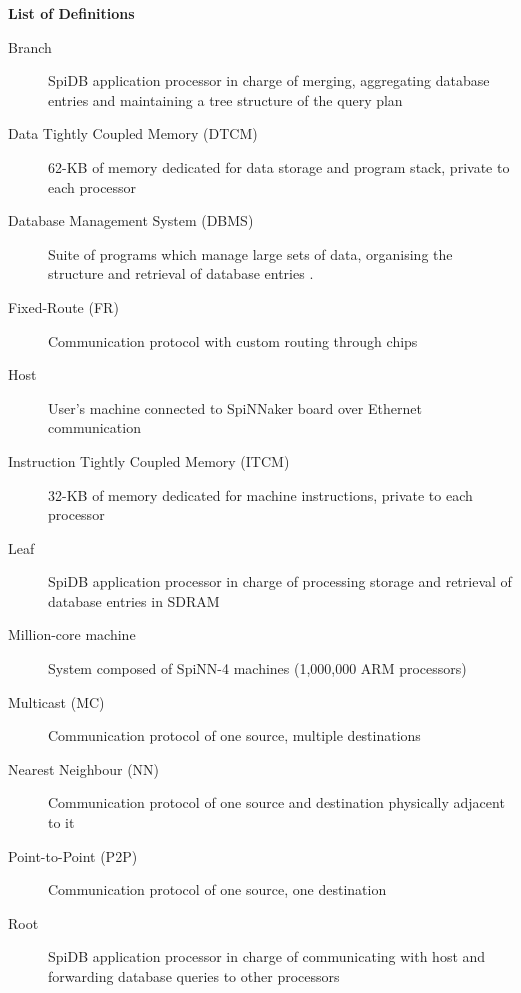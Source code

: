 \vspace*{1.5cm}
{ \huge \bfseries List of Definitions}
\vspace{7mm}

\small
\begin{description}

  \item[Branch] SpiDB application processor in charge of merging, aggregating database entries and maintaining a tree structure of the query plan

  \item[Data Tightly Coupled Memory (DTCM)] 62-KB of memory dedicated for data storage and program stack, private to each processor
  
  \item[Database Management System (DBMS)] Suite of programs which manage large sets of data, organising the structure and retrieval of database entries \cite{dbmsdef}.
   
  \item[Fixed-Route (FR)] Communication protocol with custom routing through chips   
    
  \item[Host] User's machine connected to SpiNNaker board over Ethernet communication    
    
  \item[Instruction Tightly Coupled Memory (ITCM)] 32-KB of memory dedicated for machine instructions, private to each processor    
    
  \item[Leaf] SpiDB application processor in charge of processing storage and retrieval of database entries in SDRAM    
    
  \item[Million-core machine] System composed of  SpiNN-4 machines (1,000,000 ARM processors)   
  
  \item[Multicast (MC)] Communication protocol of one source, multiple destinations    

  \item[Nearest Neighbour (NN)] Communication protocol of one source and destination physically adjacent to it

  \item[Point-to-Point (P2P)] Communication protocol of one source, one destination    
  
  \item[Root] SpiDB application processor in charge of communicating with host and forwarding database queries to other processors
  

\end{description}
